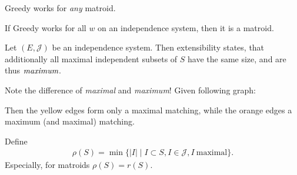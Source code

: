 \begin{corollary}
    Greedy works for \emph{any} matroid.
\end{corollary}
\begin{theorem} \label{thm:greedy-ind-is-matroid}
    If Greedy works for all $w$ on an independence system, then it is a matroid.
\end{theorem}
Let $(E,\mathcal{J})$ be an independence system. Then extensibility states,
that additionally all maximal independent subsets of $S$ have the same size, and are thus $\emph{maximum}$.
\begin{example}
    Note the difference of \emph{maximal} and \emph{maximum}! Given following graph:
    \\
    \begin{minipage}{\textwidth}
        \centering
    \end{minipage}
    Then the yellow edges form only a maximal matching, while the orange edges a maximum (and maximal) matching.
\end{example}
Define 
\begin{align*}
    \rho(S) = \min \{|I|\mid I \subset S, I \in \mathcal{J}, I\ \text{maximal}\}.        
\end{align*}
Especially, for matroids $\rho(S)=r(S)$.


